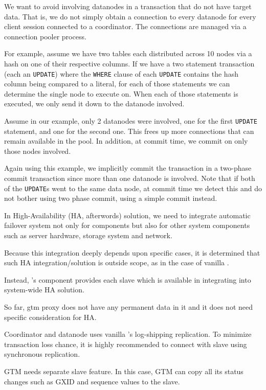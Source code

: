 

  We want to avoid involving datanodes in a transaction
  that do not have target data.
  That is, we do not simply obtain a connection to every datanode for every client
  session connected to a coordinator.
  The connections are managed via a connection pooler process.
  
  For example, assume we have two tables each distributed across 10 nodes via a hash on one
  of their respective columns.
  If we have a two statement transaction (each an \texttt{UPDATE}) where the \texttt{WHERE}
  clause of each \texttt{UPDATE} contains the hash column being compared to a literal,
  for each of those statements we can determine the single node to execute on.
  When each of those statements is executed, we only send it down to the
  datanode involved. 
  
  Assume in our example, only 2 datanodes were involved, one for the
  first \texttt{UPDATE} statement, and one for the second one.
  This frees up more connections that can remain available in the pool. In addition,
  at commit time, we commit on only those nodes involved. 
  
  Again using this example, we implicitly commit the transaction in a two-phase commit
  transaction since more than one datanode is involved. 
  Note that if both of the \texttt{UPDATE}s went to the same data
  node, at commit time we detect this and do not bother using two phase
  commit, using a simple commit instead.




  In High-Availability (HA, afterwords) solution, we need to integrate automatic
  failover system not only for \XC{} components but also for other system components
  such as server hardware, storage system and network.
  
  Because this integration deeply depends upon specific cases, it is determined that
  such HA integration/solution is outside \XC{} scope, as in the case of vanilla \PG.
  
  Instead, \XC's component provides each slave which is available in integrating
  into system-wide HA solution.
  
  So far, gtm proxy does not have any permanent data in it and it does not need
  specific consideration for HA.
  
  Coordinator and datanode uses vanilla \PG's log-shipping replication.  To minimize
  transaction loss chance, it is highly recommended to connect with slave using
  synchronous replication.
  
  GTM needs separate slave feature.
  In this case, GTM can copy all its status changes such as GXID and sequence values
  to the slave.
  
